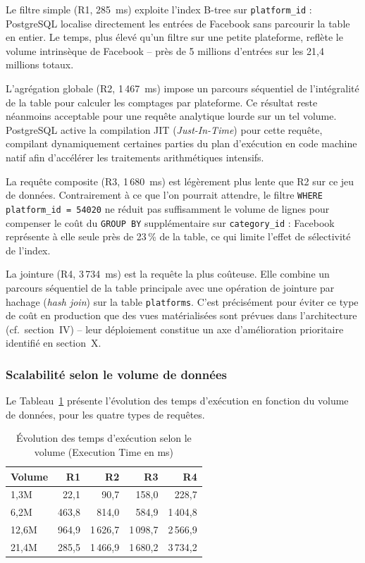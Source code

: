 \documentclass[10pt,twocolumn,a4paper]{article}
\begin{document}
Le filtre simple (R1, 285~ms) exploite l'index B-tree sur
\texttt{platform\_id} : PostgreSQL localise directement les
entrées de Facebook sans parcourir la table en entier.
Le temps, plus élevé qu'un filtre sur une petite plateforme,
reflète le volume intrinsèque de Facebook -- près de 5 millions
d'entrées sur les 21,4 millions totaux.

L'agrégation globale (R2, 1\,467~ms) impose un parcours
séquentiel de l'intégralité de la table pour calculer les
comptages par plateforme. Ce résultat reste néanmoins
acceptable pour une requête analytique lourde sur un tel
volume. PostgreSQL active la compilation JIT
(\textit{Just-In-Time}) pour cette requête, compilant
dynamiquement certaines parties du plan d'exécution en
code machine natif afin d'accélérer les traitements
arithmétiques intensifs.

La requête composite (R3, 1\,680~ms) est légèrement plus
lente que R2 sur ce jeu de données. Contrairement à ce que
l'on pourrait attendre, le filtre \texttt{WHERE platform\_id
= 54020} ne réduit pas suffisamment le volume de lignes
pour compenser le coût du \texttt{GROUP BY} supplémentaire
sur \texttt{category\_id} : Facebook représente à elle
seule près de 23\,\% de la table, ce qui limite l'effet
de sélectivité de l'index.

La jointure (R4, 3\,734~ms) est la requête la plus coûteuse.
Elle combine un parcours séquentiel de la table principale
avec une opération de jointure par hachage
(\textit{hash join}) sur la table \texttt{platforms}.
C'est précisément pour éviter ce type de coût en production
que des vues matérialisées sont prévues dans
l'architecture (cf.\ section~IV) -- leur déploiement
constitue un axe d'amélioration prioritaire identifié
en section~X.

\subsubsection{Scalabilité selon le volume de données}

Le Tableau~\ref{tab:scalability} présente l'évolution des
temps d'exécution en fonction du volume de données,
pour les quatre types de requêtes.

\begin{table}[H]
\centering
\caption{Évolution des temps d'exécution selon le volume
(Execution Time en ms)}
\label{tab:scalability}
\footnotesize
\begin{tabular}{lrrrr}
\hline
\textbf{Volume} & \textbf{R1} & \textbf{R2} &
\textbf{R3} & \textbf{R4} \\
\hline
1,3M  &    22{,}1 &    90{,}7 & 158{,}0 &   228{,}7 \\
6,2M  &   463{,}8 &   814{,}0 &   584{,}9 & 1\,404{,}8 \\
12,6M &   964{,}9 & 1\,626{,}7 & 1\,098{,}7 & 2\,566{,}9 \\
21,4M &   285{,}5 & 1\,466{,}9 & 1\,680{,}2 & 3\,734{,}2 \\
\hline
\end{tabular}
\end{table}
\end{document}
